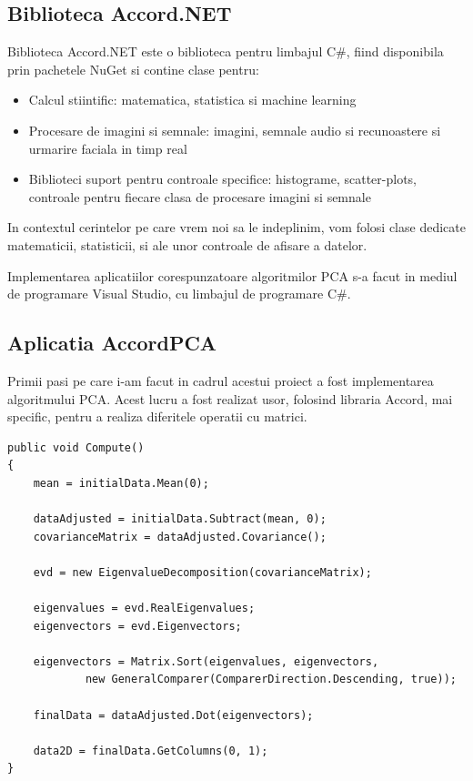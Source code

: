 \documentclass[12pt,oneside]{article}
\begin{document}
\subsection{Biblioteca Accord.NET}
Biblioteca Accord.NET este o biblioteca pentru limbajul C\#, fiind disponibila prin pachetele NuGet si contine clase pentru:
\begin{itemize}
\item Calcul stiintific: matematica, statistica si machine learning
\item Procesare de imagini si semnale: imagini, semnale audio si recunoastere si urmarire faciala in timp real
\item Biblioteci suport pentru controale specifice: histograme, scatter-plots, controale pentru fiecare clasa de procesare imagini si semnale
\end{itemize}

In contextul cerintelor pe care vrem noi sa le indeplinim, vom folosi clase dedicate matematicii, statisticii, si ale unor controale de afisare a datelor.

Implementarea aplicatiilor corespunzatoare algoritmilor PCA s-a facut in mediul de programare Visual Studio, cu limbajul de programare C\#.

\subsection{Aplicatia AccordPCA}
Primii pasi pe care i-am facut in cadrul acestui proiect a fost implementarea algoritmului PCA. Acest lucru a fost realizat usor, folosind libraria Accord, mai specific, pentru a realiza diferitele operatii cu matrici. \cite{accord_pca}

\begin{lstlisting}[basicstyle=\footnotesize]
public void Compute()
{
	mean = initialData.Mean(0);

	dataAdjusted = initialData.Subtract(mean, 0);
	covarianceMatrix = dataAdjusted.Covariance();

	evd = new EigenvalueDecomposition(covarianceMatrix);

	eigenvalues = evd.RealEigenvalues;
	eigenvectors = evd.Eigenvectors;

	eigenvectors = Matrix.Sort(eigenvalues, eigenvectors,
			new GeneralComparer(ComparerDirection.Descending, true));

	finalData = dataAdjusted.Dot(eigenvectors);

	data2D = finalData.GetColumns(0, 1);
}
\end{lstlisting}
\end{document}

